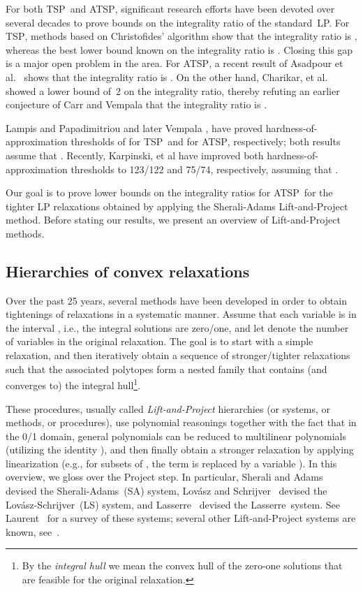 \documentclass[11pt]{article}
\newcommand{\sa}{\textsf{Sherali-Adams}}
\newcommand{\ls}{\textsf{Lov\'asz-Schrijver}}
\newcommand{\la}{\textsf{Lasserre}}
\newcommand{\iLS}{\textsf{LS}}
\newcommand{\iSA}{\textsf{SA}}
\newcommand{\tsp}{\textsc{TSP}}
\newcommand{\atsp}{\textsc{ATSP}}
\renewcommand{\P}{}
\newcommand{\NP}{}
\begin{document}
For both \tsp\ and \atsp,
significant research efforts have been devoted over several decades
to prove bounds on the integrality ratio of the standard~LP.
For \tsp, methods based on Christofides' algorithm show that
the integrality ratio is ,
whereas the best lower bound known on the integrality ratio is .
Closing this gap is a major open problem in the area.
For \atsp, a recent result of Asadpour et al.~\cite{AGMOS-soda10}
shows that the integrality ratio is .
On the other hand, Charikar, et al.~\cite{CGK06} showed a
lower bound of~2 on the integrality ratio,
thereby refuting an earlier conjecture of Carr and Vempala \cite{CV04}
that the integrality ratio is .

Lampis \cite{lampis12} and Papadimitriou and later Vempala
\cite{papad-vempala-06}, have proved
hardness-of-approximation thresholds of  for \tsp\ and
 for \atsp,  respectively;
both results assume that \P\NP.
Recently, Karpinski, et al \cite{KLS-isaac13} have improved both
hardness-of-approximation thresholds to
123/122 and 75/74, respectively, assuming that \P\NP.


Our goal is to prove lower bounds on the integrality ratios for \atsp\ 
for the tighter LP relaxations obtained by applying
the Sherali-Adams Lift-and-Project method.
Before stating our results, we present an overview of Lift-and-Project
methods.


\subsection{Hierarchies of convex relaxations}


Over the past 25 years, several methods have been developed in order
to obtain tightenings of relaxations in a systematic manner.
Assume that each variable  is in the interval ,
i.e., the integral solutions are zero/one, and
let  denote the number of variables in the original relaxation.
The goal is to start with a simple relaxation,
and then iteratively obtain a sequence of
stronger/tighter relaxations
such that the associated polytopes form a nested family
that contains (and converges to) the integral hull\footnote{
By the \textit{integral hull} we mean
the convex hull of the zero-one solutions
that are feasible for the original relaxation.}.


These procedures, usually called {\em Lift-and-Project}
hierarchies (or systems, or methods, or procedures),
use polynomial reasonings together with
the fact that in the 0/1 domain, general polynomials can be reduced
to multilinear polynomials (utilizing the identity ), and
then finally obtain a stronger relaxation by applying linearization
(e.g., for subsets  of ,
the term  is replaced by a variable ).
In this overview, we gloss over the Project step.
In particular,
Sherali and Adams~\cite{SA90} devised the \sa\ (\iSA) system,
Lov\'asz and Schrijver~\cite{LS91}
devised the \ls\ (\iLS) system,
and Lasserre~\cite{las02} devised the \la\ system.
See Laurent~\cite{Lau03} for a survey of these systems;
several other Lift-and-Project systems are known,
see~\cite{CM-chapter,AT-ipco11}.
\end{document}
